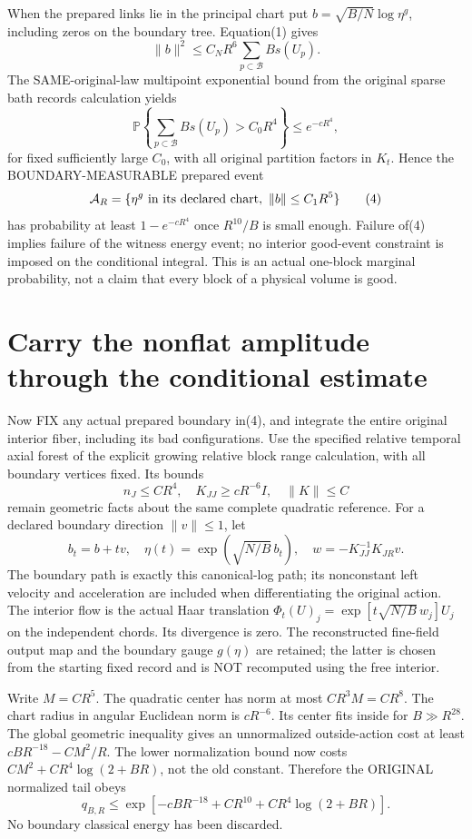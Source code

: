 \documentclass{article}
\begin{document}
When the prepared links lie in the principal chart put
$b=\sqrt{B/N}\log\eta^g$, including zeros on the boundary tree. Equation(1) gives
\[
 \|b\|^2\le C_N R^6\sum_{p\subset\mathcal B}B s(U_p).   \tag{2}
\]
The SAME-original-law multipoint exponential bound from the original sparse bath records calculation yields
\[
 \mathbb P\left\{\sum_{p\subset\mathcal B}B s(U_p)>C_0R^4\right\}
 \le e^{-cR^4},                                      \tag{3}
\]
for fixed sufficiently large $C_0$, with all original partition factors in $K_t$. Hence the BOUNDARY-MEASURABLE prepared event
\[
 \mathcal A_R=\{\eta^g\hbox{ in its declared chart},\
                    \|b\|\le C_1R^{5}\}             \tag{4}
\]
has probability at least $1-e^{-cR^4}$ once $R^{10}/B$ is small enough. Failure of(4) implies failure of the witness energy event; no interior good-event constraint is imposed on the conditional integral. This is an actual one-block marginal probability, not a claim that every block of a physical volume is good.

\section*{Carry the nonflat amplitude through the conditional estimate}
Now FIX any actual prepared boundary in(4), and integrate the entire original interior fiber, including its bad configurations. Use the specified relative temporal axial forest of the explicit growing relative block range calculation, with all boundary vertices fixed. Its bounds
\[
 n_J\le CR^4,\quad K_{JJ}\ge cR^{-6}I,\quad \|K\|\le C
\]
remain geometric facts about the same complete quadratic reference. For a declared boundary direction $\|v\|\le1$, let
\[
 b_t=b+tv,\quad \eta(t)=\exp(\sqrt{N/B}\,b_t),\quad
 w=-K_{JJ}^{-1}K_{JR}v.
\]
The boundary path is exactly this canonical-log path; its nonconstant left velocity and acceleration are included when differentiating the original action. The interior flow is the actual Haar translation
$\Phi_t(U)_j=\exp[t\sqrt{N/B}\,w_j]U_j$ on the independent chords. Its divergence is zero. The reconstructed fine-field output map and the boundary gauge $g(\eta)$ are retained; the latter is chosen from the starting fixed record and is NOT recomputed using the free interior.

Write $M=C R^{5}$. The quadratic center has norm at most $CR^3M=CR^{8}$. The chart radius in angular Euclidean norm is $cR^{-6}$. Its center fits inside for $B\gg R^{28}$. The global geometric inequality gives an unnormalized outside-action cost at least $cBR^{-18}-CM^2/R$. The lower normalization bound now costs $CM^2+CR^4\log(2+BR)$, not the old constant. Therefore the ORIGINAL normalized tail obeys
\[
 q_{B,R}\le
 \exp[-cBR^{-18}+CR^{10}+CR^4\log(2+BR)].                \tag{5}
\]
No boundary classical energy has been discarded.
\end{document}
